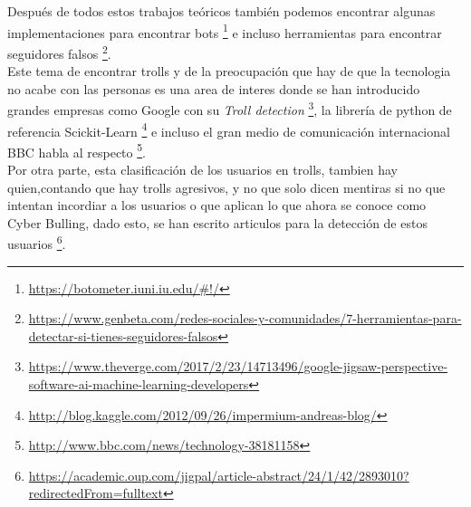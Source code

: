\documentclass[../all.tex]{subfiles}
\begin{document}
    Después de todos estos trabajos teóricos también podemos encontrar algunas implementaciones para encontrar bots \footnote{\url{https://botometer.iuni.iu.edu/\#!/}} e incluso herramientas para encontrar seguidores falsos \footnote{\url{https://www.genbeta.com/redes-sociales-y-comunidades/7-herramientas-para-detectar-si-tienes-seguidores-falsos}}.\\
    
    Este tema de encontrar trolls y de la preocupación que hay de que la tecnologia no acabe con las personas es una area de interes donde se han introducido grandes empresas como Google con su 
    \textit{Troll detection} \footnote{\url{https://www.theverge.com/2017/2/23/14713496/google-jigsaw-perspective-software-ai-machine-learning-developers}}, la librería de python de referencia Scickit-Learn \footnote{\url{http://blog.kaggle.com/2012/09/26/impermium-andreas-blog/}}
    e incluso el gran medio de comunicación internacional BBC habla al respecto
    \footnote{ \url{http://www.bbc.com/news/technology-38181158}}.\\
    
    Por otra parte, esta clasificación de los usuarios en trolls, tambien hay quien,contando que hay trolls agresivos, y no que solo dicen mentiras si no que intentan incordiar a los usuarios o que aplican lo que ahora se conoce como Cyber Bulling, dado esto, se han escrito articulos para la detección de estos usuarios \footnote{\url{https://academic.oup.com/jigpal/article-abstract/24/1/42/2893010?redirectedFrom=fulltext}}.\\
    

   
\end{document}
